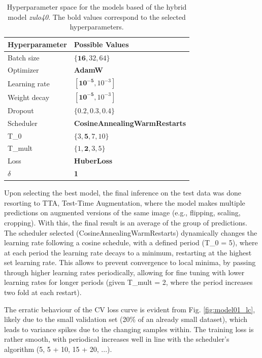 \documentclass[conference]{IEEEtran}
\begin{document}
\begin{table}[b]
\centering
\caption{Hyperparameter space for the models based of the hybrid model \textit{zulo40}. The bold values correspond to the selected hyperparameters.}
\label{parametroszulp}
\begin{tabular}{ll}
\toprule
\textbf{Hyperparameter} & \textbf{Possible Values} \\
\midrule
Batch size & $\{\mathbf{16}, 32, 64\}$ \\
Optimizer & \textbf{AdamW} \\
Learning rate & $[\mathbf{10^{-5}}, 10^{-3}]$ \\
Weight decay & $[\mathbf{10^{-5}}, 10^{-3}]$ \\
Dropout & $\{0.2, 0.3, \mathbf{0.4}\}$ \\
Scheduler & \textbf{CosineAnnealingWarmRestarts} \\
T\_0 & $\{3, \mathbf{5}, 7, 10\}$ \\
T\_mult & $\{1, \mathbf{2}, 3, 5\}$ \\
Loss & \textbf{HuberLoss} \\
$\delta$ & \textbf{1} \\
\bottomrule
\end{tabular}
\end{table}
\newpage

Upon selecting the best model, the final inference on the test data was done resorting to TTA, Test-Time Augmentation, where the model makes multiple predictions on augmented versions of the same image (e.g., flipping, scaling, cropping). With this, the final result is an average of the group of predictions. The scheduler selected (CosineAnnealingWarmRestarts) dynamically changes the learning rate following a cosine schedule, with a defined period (T\_0 = 5), where at each period the learning rate decays to a minimum, restarting at the highest set learning rate. This allows to prevent convergence to local minima, by passing through higher learning rates periodically, allowing for fine tuning with lower learning rates for longer periods (given T\_mult = 2, where the period increases two fold at each restart).


The erratic behaviour of the CV loss curve is evident from Fig. \ref{fig:model01_lc}, likely due to the small validation set (20\% of an already small dataset), which leads to variance spikes due to the changing samples within. The training loss is rather smooth, with periodical increases well in line with the scheduler's algorithm (5, 5 + 10, 15 + 20, ...).
\end{document}
